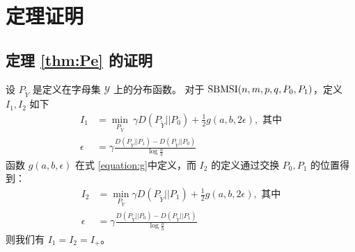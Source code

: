 \section{定理证明}\label{sec:sbmsi_proof}
\subsection{定理 \ref{thm:Pe} 的证明}
\begin{lemma}\label{lem:p0p12}
    设 $P_{\widetilde{Y}}$ 是定义在字母集
    $\mathcal{Y}$ 上的分布函数。
    对于 $\operatorname{SBMSI}(n,m,p,q,P_0,P_1)$，定义
    $I_1, I_2$ 如下
    \begin{align}
        I_1 &=\min_{P_{\widetilde{Y}}}\  \gamma D(P_{\widetilde{Y}}|| P_0)+ \frac{1}{2} g(a,b, 2\epsilon),
        \text{ 其中}\nonumber\\
        \epsilon &= \gamma \frac{D(P_{\widetilde{Y}} || P_1) - D(P_{\widetilde{Y}} || P_0) }{\log \frac{a}{b}}\label{eq:I1}
    \end{align}
    函数 $g(a,b,\epsilon)$ 在式 \eqref{equation:g}中定义，而 $I_2$ 的定义通过交换 $P_0, P_1$ 的位置得到：
    \begin{align}
        I_2 & = \min_{P_{\widetilde{Y}}} \gamma D(P_{\widetilde{Y}}|| P_1)+ \frac{1}{2} g(a,b, 2\epsilon),
        \text{ 其中}\nonumber\\
        \epsilon &= \gamma \frac{D(P_{\widetilde{Y}} || P_0) - D(P_{\widetilde{Y}} || P_1) }{\log \frac{a}{b}}
        \label{eq:I2}
    \end{align}
     则我们有 $I_1=I_2=I_+$。
\end{lemma}
